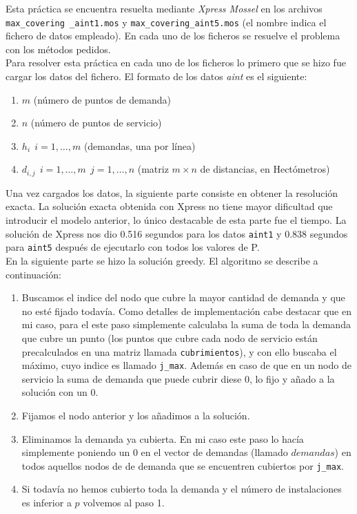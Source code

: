\documentclass[a4paper,11pt]{article}
\begin{document}
Esta práctica se encuentra resuelta mediante \textit{Xpress Mossel} en los archivos \texttt{max\_covering \_aint1.mos} y \texttt{max\_covering\_aint5.mos} (el nombre indica el fichero de datos empleado). En cada uno de los ficheros se resuelve el problema con los métodos pedidos.\\

Para resolver esta práctica en cada uno de los ficheros lo primero que se hizo fue cargar los datos del fichero. El formato de los datos \textit{aint} es el siguiente:

\begin{enumerate}
\item ${m}$ (número de puntos de demanda)
\item ${n}$ (número de puntos de servicio)
\item ${h_i		\ \ i=1,\ldots,m}$ (demandas, una por línea)
\item ${d_{i,j}	\ \ i=1,\ldots,m \ \ j=1,\ldots,n}$ (matriz ${m \times n}$ de distancias, en Hectómetros)
\end{enumerate}

Una vez cargados los datos, la siguiente parte consiste en obtener la resolución exacta. La solución exacta obtenida con Xpress no tiene mayor dificultad que introducir el modelo anterior, lo único destacable de esta parte fue el tiempo. La solución de Xpress nos dio 0.516 segundos para los datos \texttt{aint1} y 0.838 segundos para \texttt{aint5} después de ejecutarlo con todos los valores de P.\\

En la siguiente parte se hizo la solución greedy. El algoritmo se describe a continuación:

\begin{enumerate}
\item Buscamos el indice del nodo que cubre la mayor cantidad de demanda y que no esté fijado todavía. Como detalles de implementación cabe destacar que en mi caso, para el este paso simplemente calculaba la suma de toda la demanda que cubre un punto (los puntos que cubre cada nodo de servicio están precalculados en una matriz llamada \texttt{cubrimientos}), y con ello buscaba el máximo, cuyo indice es llamado \texttt{j\_max}. Además en caso de que en un nodo de servicio la suma de demanda que puede cubrir diese 0, lo fijo y añado a la solución con un 0.
\item Fijamos el nodo anterior y los añadimos a la solución.
\item Eliminamos la demanda ya cubierta. En mi caso este paso lo hacía simplemente poniendo un 0 en el vector de demandas (llamado ${demandas}$) en todos aquellos nodos de de demanda que se encuentren cubiertos por \texttt{j\_max}.
\item Si todavía no hemos cubierto toda la demanda y el número de instalaciones es inferior a ${p}$ volvemos al paso 1.
\end{enumerate}
\end{document}
